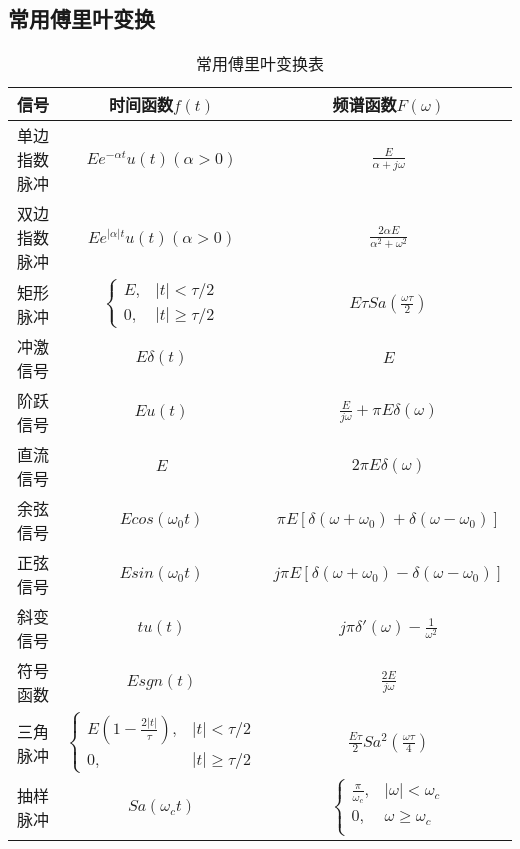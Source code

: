 \documentclass[UTF8]{article}
\theoremstyle{definition}
\begin{document}
\subsection{常用傅里叶变换}
\begin{center}
\begin{table}[ht]
  \centering
    \caption{常用傅里叶变换表}
  \begin{tabular}{ccc}
    \toprule
    信号 & 时间函数$f(t)$ & 频谱函数$F(\omega)$ \\
    \midrule
    单边指数脉冲 & $Ee^{-\alpha t}u(t)(\alpha>0)$ & $\frac{E}{\alpha+ j\omega}$ \\[10pt]
    双边指数脉冲 & $Ee^{|\alpha| t}u(t)(\alpha>0)$ & $\frac{2\alpha E}{\alpha^2+ \omega^2}$ \\[10pt]
    矩形脉冲 & $\begin{cases}E,&|t|<\tau /2\\ 0,&|t|\geq \tau /2\end{cases}$  & $E\tau Sa(\frac{\omega\tau}{2})$ \\[15pt]
    冲激信号 & $E\delta(t)$ & $E$\\[10pt]
    阶跃信号 & $Eu(t)$ & $\frac{E}{j\omega}+\pi E\delta(\omega)$\\[10pt]
    直流信号 & $E$ & $2\pi E\delta(\omega)$\\[10pt]
    余弦信号 & $Ecos(\omega_0 t)$ & $\pi E[\delta(\omega+\omega_0)+\delta(\omega-\omega_0)]$\\[10pt]
    正弦信号 & $Esin(\omega_0 t)$ & $j\pi E[\delta(\omega+\omega_0)-\delta(\omega-\omega_0)]$\\[10pt]
    斜变信号 & $tu(t)$ & $j\pi\delta'(\omega)-\frac{1}{\omega^2}$\\[10pt]
    符号函数 &$Esgn(t)$ & $\frac{2E}{j\omega}$\\[10pt]
    三角脉冲 & $\begin{cases}E(1-\frac{2|t|}{\tau}),&|t|<\tau /2\\ 0,&|t|\geq \tau /2\end{cases}$  & $\frac{E\tau}{2}Sa^2(\frac{\omega\tau}{4})$  \\[15pt]
    抽样脉冲 & $Sa(\omega_c t)$  & $\begin{cases}\frac{\pi}{\omega_c},&|\omega|<\omega_c \\ 0, &\omega\geq \omega_c \\ \end{cases}$\\[15pt]
    \bottomrule
  \end{tabular}
\end{table}
\end{center}
\FloatBarrier
\end{document}
